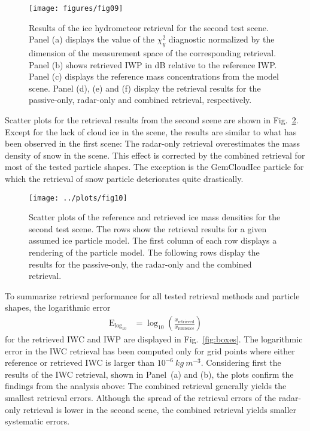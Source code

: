 \documentclass[journal abbreviation, manuscript]{copernicus}
\begin{document}
\begin{figure}
\centering
\texttt{[image: figures/fig09]}
\caption{Results of the ice hydrometeor retrieval for the second test scene.
  Panel (a) displays the value of the $\chi^2_y$ diagnostic normalized by the
  dimension of the measurement space of the corresponding retrieval. Panel (b)
  shows retrieved IWP in dB relative to the reference IWP. Panel (c) displays
  the reference mass concentrations from the model scene. Panel (d), (e) and (f)
  display the retrieval results for the passive-only, radar-only and combined
  retrieval, respectively.}
\label{fig:results_b}
\end{figure}

Scatter plots for the retrieval results from the second scene are shown in
Fig.~\ref{fig:results_scatter_b_1}. Except for the lack of cloud ice in the
scene, the results are similar to what has been observed in the first scene: The
radar-only retrieval overestimates the mass density of snow in the scene. This
effect is corrected by the combined retrieval for most of the tested particle
shapes. The exception is the GemCloudIce particle for which the retrieval of
snow particle deteriorates quite drastically.

\begin{figure}[!h]
\centering
\texttt{[image: ../plots/fig10]}
\caption{Scatter plots of the reference and retrieved ice mass densities for
  the second test scene. The rows show the retrieval results for a given
  assumed ice particle model. The first column of each row displays a rendering
  of the particle model. The following rows display the results for the
  passive-only, the radar-only and the combined retrieval.}
\label{fig:results_scatter_b_1}
\end{figure}

To summarize retrieval performance for all tested retrieval methods and particle
shapes, the logarithmic error
\begin{align}
  \text{E}_{\text{log}_{10}} &= \log_\text{10} \left (\frac{x_\text{retrieved}}{x_\text{reference}} \right )
\end{align}
for the retrieved IWC and IWP are displayed in Fig.~\ref{fig:boxes}. The
logarithmic error in the IWC retrieval has been computed only for grid points
where either reference or retrieved IWC is larger than
$10^{-6}\ \unit{kg\ m^{-3}}$. Considering first the results of the IWC
retrieval, shown in Panel~(a) and (b), the plots confirm the findings from the
analysis above: The combined retrieval generally yields the smallest retrieval
errors. Although the spread of the retrieval errors of the radar-only retrieval
is lower in the second scene, the combined retrieval yields smaller systematic
errors.
\end{document}
